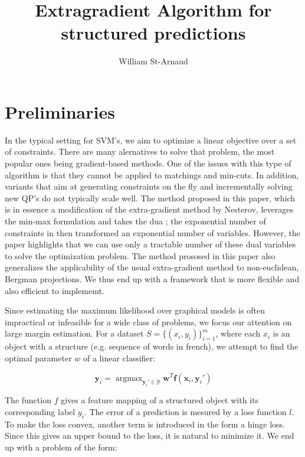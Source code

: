 \documentclass{article}
\title{Extragradient Algorithm for structured predictions}
\author{William St-Arnaud}
\DeclareMathOperator*{\argmax}{\arg\max}
\renewcommand{\vec}{\mathbf}
\begin{document}
\maketitle

\section{Preliminaries}

In the typical setting for SVM's, we aim to optimize a linear objective over a set of constraints. There are many alernatives to solve that problem, the most popular ones being gradient-based methods. One of the issues with this type of algorithm is that they cannot be applied to matchings and min-cuts. In addition, variants that aim at generating constraints on the fly and incrementally solving new QP's do not typically scale well. The method proposed in this paper, which is in essence a modification of the extra-gradient method by Nesterov, leverages the min-max formulation and takes the dua ; the exponential number of constraints in then transformed an exponential number of variables. However, the paper highlights that we can use only a tractable number of these dual variables to solve  the optimization problem. The method prososed in this paper also generalizes the applicability of the usual extra-gradient method to non-euclidean, Bergman projections. We thus end up with a framework that is more flexible and also efficient to implememt. 

Since estimating the maximum likelihood over graphical models is often impractical or infeasible for a wide class of problems, we focus our attention on large margin estimation. For a dataset $ S = \{ (x_i, y_i) \}_{i=1}^{m} $, where each $x_i$ is an object with a structure (e.g. sequence of words in french), we attempt to find the optimal parameter $w$ of a linear classifier:

\begin{equation}
  \vec y_i = \argmax_{\vec y_i' \in \mathcal{Y}} \vec w^T \vec f(\vec x_i,\vec y_i')
  \label{eq1}
\end{equation}

The function $f$ gives a feature mapping of a structured object with its corresponding label $y_i$. The error of a prediction is mesured by a loss function $l$. To make the loss convex, another term is introduced in the form a hinge loss. Since this gives an upper bound to the loss, it is natural to minimize it. We end up with a problem of the form:
\end{document}

